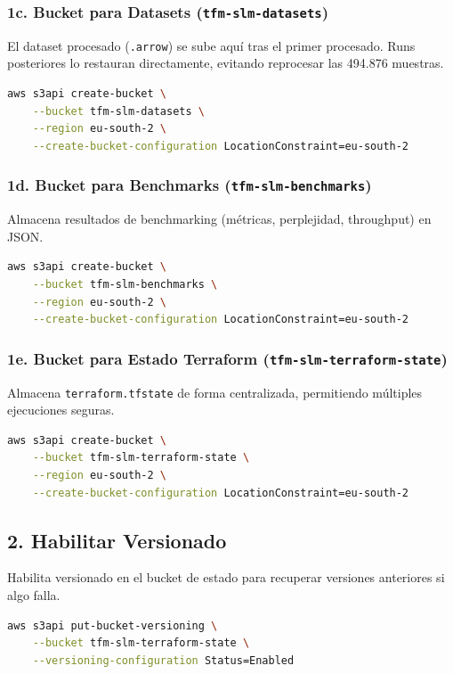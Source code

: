 \subsubsection{1c. Bucket para Datasets (\texttt{tfm-slm-datasets})}
El dataset procesado (\texttt{.arrow}) se sube aquí tras el primer procesado. Runs posteriores lo restauran directamente, evitando reprocesar las 494.876 muestras.

\begin{lstlisting}[language=bash]
aws s3api create-bucket \
    --bucket tfm-slm-datasets \
    --region eu-south-2 \
    --create-bucket-configuration LocationConstraint=eu-south-2
\end{lstlisting}

\subsubsection{1d. Bucket para Benchmarks (\texttt{tfm-slm-benchmarks})}
Almacena resultados de benchmarking (métricas, perplejidad, throughput) en JSON.

\begin{lstlisting}[language=bash]
aws s3api create-bucket \
    --bucket tfm-slm-benchmarks \
    --region eu-south-2 \
    --create-bucket-configuration LocationConstraint=eu-south-2
\end{lstlisting}

\subsubsection{1e. Bucket para Estado Terraform (\texttt{tfm-slm-terraform-state})}
Almacena \texttt{terraform.tfstate} de forma centralizada, permitiendo múltiples ejecuciones seguras.

\begin{lstlisting}[language=bash]
aws s3api create-bucket \
    --bucket tfm-slm-terraform-state \
    --region eu-south-2 \
    --create-bucket-configuration LocationConstraint=eu-south-2
\end{lstlisting}

\subsection{2. Habilitar Versionado}

Habilita versionado en el bucket de estado para recuperar versiones anteriores si algo falla.

\begin{lstlisting}[language=bash, caption={Versionado en bucket de estado Terraform.}]
aws s3api put-bucket-versioning \
    --bucket tfm-slm-terraform-state \
    --versioning-configuration Status=Enabled
\end{lstlisting}

